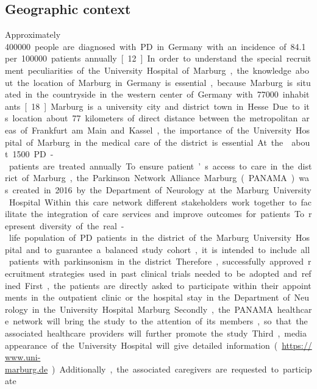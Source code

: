 \subsection{Geographic context}
Approximately \SI{400000} people are diagnosed with \ac{PD} in Germany with an incidence of \SI{84.1} per \SI{100000} patients annually [12]. In order to understand the special recruitment peculiarities of the University Hospital of Marburg, the knowledge about the location of Marburg in Germany is essential, because Marburg is situated in the countryside in the western center of Germany with \SI{77000} inhabitants [18]. Marburg is a university city and district town in Hesse. Due to its location about 77 kilometers of direct distance between the metropolitan areas of Frankfurt am Main and Kassel, the importance of the University Hospital of Marburg in the medical care of the district is essential. At the \UKGM about 1500 PD-patients are treated annually. To ensure patient’s access to care in the district of Marburg, the Parkinson Network Alliance Marburg (PANAMA) was created in 2016 by the Department of Neurology at the Marburg University Hospital. Within this care network different stakeholders work together to facilitate the integration of care services and improve outcomes for patients. 

To represent diversity of the real-life population of PD patients in the district of the Marburg University Hospital and to guarantee a balanced study cohort, it is intended to include all patients with parkinsonism in the district. Therefore, successfully approved recruitment strategies used in past clinical trials needed to be adopted and refined. First, the patients are directly asked to participate within their appointments in the outpatient clinic or the hospital stay in the Department of Neurology in the University Hospital Marburg. Secondly, the PANAMA healthcare network will bring the study to the attention of its members, so that the associated healthcare providers will further promote the study. Third, media appearance of the University Hospital will give detailed information (\url{https://www.uni-marburg.de}). Additionally, the associated caregivers are requested to participate. 

\newpage
